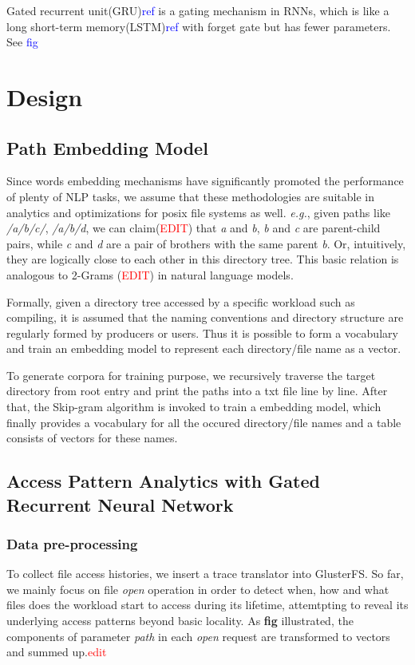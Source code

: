 \documentclass[conference]{IEEEtran}
\begin{document}
Gated recurrent unit(GRU)\textcolor{blue}{ref} is a gating mechanism in RNNs, 
which is like a long short-term memory(LSTM)\textcolor{blue}{ref} with forget gate but has fewer parameters.
See \textcolor{blue}{fig} 



\section{Design}
\subsection{Path Embedding Model}
Since words embedding mechanisms have significantly promoted the performance of plenty of NLP tasks, 
we assume that these methodologies are suitable in analytics and optimizations for posix file systems as well.
\textit{e.g.}, given paths like \textit{/a/b/c/}, \textit{/a/b/d}, we can claim(\textcolor{red}{EDIT}) that \textit{a} and \textit{b},
\textit{b} and \textit{c} are parent-child pairs, while \textit{c} and \textit{d} are a pair of brothers with the same parent \textit{b}.
Or, intuitively, they are logically close to each other in this directory tree. 
This basic relation is analogous to 2-Grams (\textcolor{red}{EDIT}) in natural language models.

Formally, given a directory tree accessed by a specific workload such as compiling, 
it is assumed that the naming conventions and directory structure are regularly formed by producers or users.
Thus it is possible to form a vocabulary and train an embedding model to represent each directory/file name as a vector.

To generate corpora for training purpose,
we recursively traverse the target directory from root entry and print the paths into a txt file line by line.
After that, the Skip-gram algorithm is invoked to train a embedding model, 
which finally provides a vocabulary for all the occured directory/file names and a table consists of vectors for these names.


\subsection{Access Pattern Analytics with Gated Recurrent Neural Network}
\subsubsection{Data pre-processing}
To collect file access histories, we insert a trace translator into GlusterFS.
So far, we mainly focus on file \textit{open} operation in order to detect when, how and what files does the workload start to access during its lifetime,
attemtpting to reveal its underlying access patterns beyond basic locality. 
As \textbf{fig} illustrated, the components of parameter \textit{path} in each \textit{open} request are transformed to vectors and summed up.\textcolor{red}{edit} 
\end{document}
